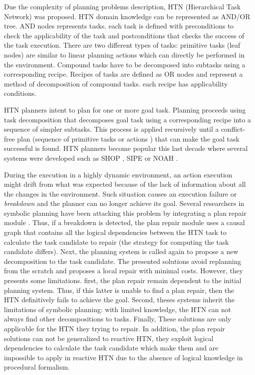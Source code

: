 \documentclass[conference]{IEEEtran}
\begin{document}
	\par Due the complexity of planning problems description, HTN (Hierarchical Task Network)  \cite{erol1996hierarchical} was proposed. 	
	HTN domain knowledge can be represented as AND/OR tree. AND nodes represents tasks. each task is defined with preconditions to check the applicability of the task and postconditions  that checks the success of the task execution. There are two different types of tasks: primitive tasks (leaf nodes) are similar to linear planning actions which can directly be performed in the environment. Compound tasks have to be decomposed into subtasks using a corresponding recipe. Recipes of tasks are defined as OR nodes and represent a method of decomposition of compound tasks. each recipe has  applicability conditions.
	\par  HTN planners intent to plan for one or more goal task. Planning proceeds using task decomposition that decomposes goal task  using a corresponding recipe into a sequence of simpler subtasks. This process is applied recursively until a conflict-free plan (sequence of primitive tasks or actions ) that can make the goal task successful is found. 
	HTN planners become popular this last decade  where several systems were developed such as SHOP \cite{nau1999shop}, SIPE \cite{wilkins1988practical} or NOAH  \cite{sacerdoti1975structure}. 
	\par During the execution in a highly dynamic environment, an action execution might drift from what was expected because of the lack of information about all the changes in the environment. Such situation causes an execution failure or \emph{breakdown} and the planner can no longer achieve its goal. 
	Several researchers in symbolic planning have been attacking this problem by integrating a plan repair module \cite{boella2002replanning, van2005plan,hayashi2006dynagent,ayan2007hotride,warfield2007adaptation}. Thus, if a breakdown is detected, the plan repair module uses a causal graph that contains all the logical dependencies between the HTN task  to calculate the task candidate to repair (the strategy for computing the task candidate differs). Next, the planning system is called again to propose a new decomposition to the  task candidate.
	The presented solutions avoid replanning from the scratch and proposes a local repair with minimal costs. However, they presents some limitations. first, the plan repair remain dependent to the initial planning system. Thus, if this latter is unable to find a plan repair, then the HTN definitively fails to achieve the goal. Second, theses systems inherit the limitations of symbolic planning: with limited knowledge, the HTN can not always find other decompositions to tasks. Finally,  These solutions are only applicable for the HTN they trying to repair. In addition, the plan repair solutions can not be generalized to reactive HTN, they exploit  logical dependencies to calculate the task candidate which make them and are impossible to apply in reactive HTN due to the absence of logical knowledge in procedural formalism.
\end{document}
